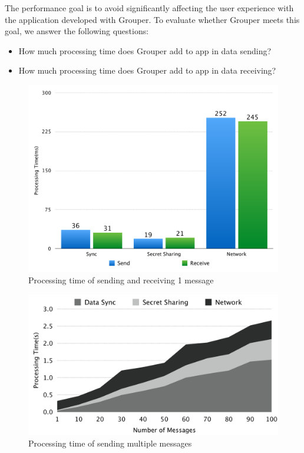 \documentclass[twocolumn,10pt]{article}
\begin{document}
The performance goal is to avoid significantly affecting the user experience with the application developed with Grouper. To evaluate whether Grouper meets this goal, we answer the following questions:

\begin{itemize}
	\setlength{\itemsep}{1pt}
	\setlength{\parskip}{0pt}
	\setlength{\parsep}{0pt}
	\item How much processing time does Grouper add to app in data sending?
	\item How much processing time does Grouper add to app in data receiving?
\end{itemize}

\begin{figure}[t]
	\centering
	\includegraphics[scale=0.23]{processing1}
	\caption{Processing time of sending and receiving 1 message}
\end{figure}

\begin{figure}[t]
	\centering
	\includegraphics[scale=0.23]{processing2}
	\caption{Processing time of sending multiple messages}
\end{figure}
\end{document}
